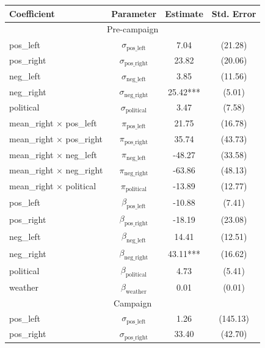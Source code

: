 \documentclass[12pt]{article}
\begin{document}
	
	
	
	\begin{table}[ht]
		\centering
		\begin{threeparttable}
			\begin{tabular}{lccc}
				\hline
				\textbf{Coefficient} & \textbf{Parameter} & \textbf{Estimate} & \textbf{Std. Error} \\
				\hline
				\hline
				\multicolumn{4}{c}{{Pre-campaign}} \\
				\hline
				\hline
				pos\_left & $ \sigma_{\text{pos\_left}} $ & 7.04 & (21.28) \\
				pos\_right & $ \sigma_{\text{pos\_right}} $ & 23.82 & (20.06) \\
				neg\_left & $ \sigma_{\text{neg\_left}} $ & 3.85 & (11.56) \\
				neg\_right & $ \sigma_{\text{neg\_right}} $ & 25.42*** & (5.01) \\
				political & $ \sigma_{\text{political}} $ & 3.47 & (7.58) \\
				\hline
				mean\_right $\times$ pos\_left & $ \pi_{\text{pos\_left}} $ & 21.75 & (16.78) \\
				mean\_right $\times$ pos\_right & $ \pi_{\text{pos\_right}} $ & 35.74 & (43.73) \\
				mean\_right $\times$ neg\_left & $ \pi_{\text{neg\_left}} $ & -48.27 & (33.58) \\
				mean\_right $\times$ neg\_right & $ \pi_{\text{neg\_right}} $ & -63.86 & (48.13) \\
				mean\_right $\times$ political & $ \pi_{\text{political}} $ & -13.89 & (12.77) \\
				\hline
				pos\_left & $ \beta_{\text{pos\_left}} $ & -10.88 & (7.41) \\
				pos\_right & $ \beta_{\text{pos\_right}} $ & -18.19 & (23.08) \\
				neg\_left & $ \beta_{\text{neg\_left}} $ & 14.41 & (12.51) \\
				neg\_right & $ \beta_{\text{neg\_right}} $ & 43.11*** & (16.62) \\
				political & $ \beta_{\text{political}} $ & 4.73 & (5.41) \\
				weather & $ \beta_{\text{weather}} $ & 0.01 & (0.01) \\
				\hline
				\hline
				\multicolumn{4}{c}{{Campaign}} \\
				\hline
				\hline
				pos\_left & $ \sigma_{\text{pos\_left}} $ & 1.26 & (145.13) \\
				pos\_right & $ \sigma_{\text{pos\_right}} $ & 33.40 & (42.70) \\

\end{tabular}
\end{threeparttable}
\end{table}
\end{document}

